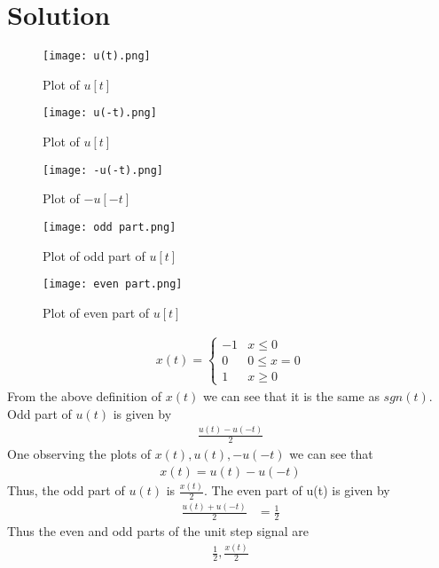 \documentclass[journal,12pt,twocolumn]{IEEEtran}
\begin{document}
\section{Solution}
\begin{figure}[!ht]
         \centering
         \texttt{[image: u(t).png]}
         \caption{Plot of $u[t]$}
         \label{plot2}
\end{figure}
\begin{figure}[!ht]
         \centering
         \texttt{[image: u(-t).png]}
         \caption{Plot of $u[t]$}
         \label{plot3}
\end{figure}
\begin{figure}[!ht]
         \centering
         \texttt{[image: -u(-t).png]}
         \caption{Plot of $-u[-t]$}
         \label{plot4}
\end{figure}
\begin{figure}[!ht]
         \centering
         \texttt{[image: odd part.png]}
         \caption{Plot of odd part of $u[t]$}
         \label{plot5}
\end{figure}
\begin{figure}[!ht]
         \centering
         \texttt{[image: even part.png]}
         \caption{Plot of even part of $u[t]$}
         \label{plot6}
\end{figure}
\begin{align} x(t)=\begin{cases} 
      -1 & x\leq 0 \\
      0 & 0\leq x=0 \\
      1 & x\geq 0
   \end{cases}
\end{align}
From the above definition of $x(t)$ we can see that it is the same as $sgn(t)$.
Odd part of $u(t)$ is given by
\begin{align}
    \frac{u(t)-u(-t)}{2}
\end{align}
One observing the plots of $x(t),u(t),-u(-t)$ we can see that
\begin{align}
    x(t)=u(t)-u(-t)
\end{align}
Thus, the odd part of $u(t)$ is $\frac{x(t)}{2}$.
The even part of u(t) is given by
\begin{align}
 \frac{u(t)+u(-t)}{2} &=\frac{1}{2}  
\end{align}
Thus the even and odd parts of the unit step signal are
\begin{align}
   \frac{1}{2} , \frac{x(t)}{2}
\end{align}
\end{document}
